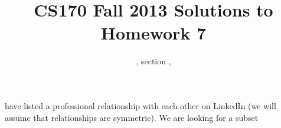 \message{ !name(ps7.tex)}\documentclass[11pt]{article}
\title{CS170  Fall 2013 Solutions to Homework 7}
\author{\Name, section \Sec, \texttt{\Login}}
\begin{document}
 have listed a professional 
relationship with each other on LinkedIn (we will assume that relationships are symmetric). 
We are looking for a subset 
\end{document}
